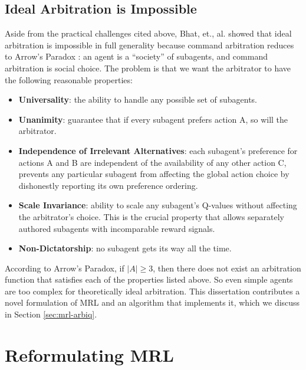 \subsection{Ideal Arbitration is Impossible}

Aside from the practical challenges cited above, Bhat, et., al. \cite{bhat2006on-the-difficulty} \cite{bhat2006on-the-difficulty} showed that ideal arbitration is impossible in full generality because command arbitration reduces to Arrow's Paradox \cite{arrow1963social}: an agent is a ``society'' of subagents, and command arbitration is social choice.  The problem is that we want the arbitrator to have the following reasonable properties:

\begin{itemize}

\item \textbf{Universality}: the ability to handle any possible set of
  subagents.

\item \textbf{Unanimity}: guarantee that if every subagent prefers
  action A, so will the arbitrator.

\item \textbf{Independence of Irrelevant Alternatives}: each
  subagent's preference for actions A and B are independent of the
  availability of any other action C, prevents any particular
  subagent from affecting the global action choice by dishonestly
  reporting its own preference ordering.

\item \textbf{Scale Invariance}: ability to scale any subagent's
  Q-values without affecting the arbitrator's choice.  This is the
  crucial property that allows separately authored subagents with
  incomparable reward signals.

\item \textbf{Non-Dictatorship}: no subagent gets its way all the time.

\end{itemize}

According to Arrow's Paradox, if $|A|\geq 3$, then there does not exist an arbitration function that satisfies each of the properties listed above.  So even simple agents are too complex for theoretically ideal arbitration.  This dissertation contributes a novel formulation of MRL and an algorithm that implements it, which we discuss in Section \ref{sec:mrl-arbiq}.

\section{Reformulating MRL}


